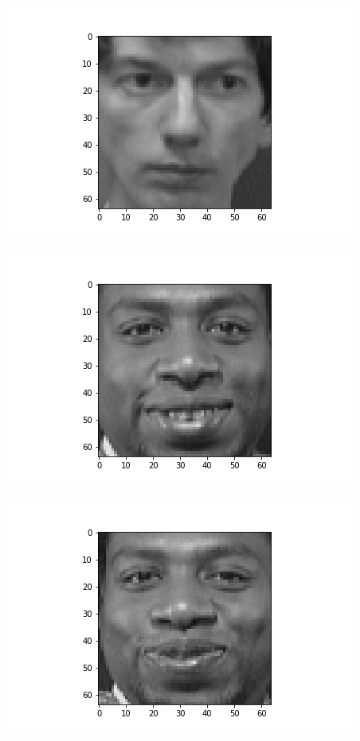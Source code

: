 \documentclass[12pt, a4paper]{article}
\begin{document}
\begin{figure}[h]
    \begin{subfigure}{0.3\linewidth}
        \centering
        \includegraphics[width=\linewidth]{images/q3/c/6/0.png}
    \end{subfigure}
    \hfill
    \begin{subfigure}{0.3\linewidth}
        \centering
        \includegraphics[width=\linewidth]{images/q3/c/6/1.png}
    \end{subfigure}
    \hfill
    \begin{subfigure}{0.3\linewidth}
        \centering
        \includegraphics[width=\linewidth]{images/q3/c/6/2.png}

\end{subfigure}
\end{figure}
\end{document}
